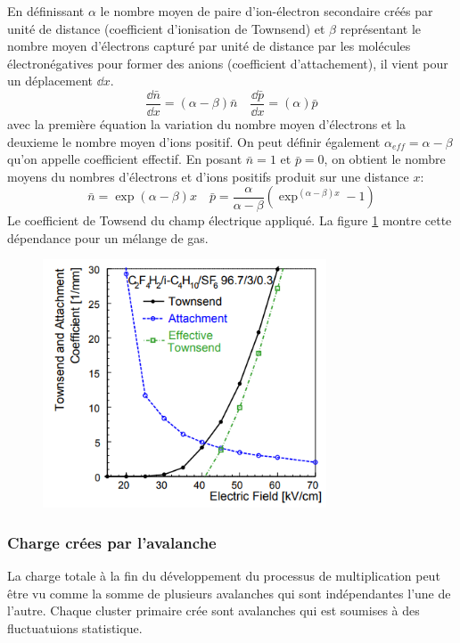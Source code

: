En définissant $\alpha$ le nombre moyen de paire d'ion-électron secondaire créés par unité de distance (coefficient d'ionisation de Townsend) et  $\beta$ représentant le nombre moyen d'électrons capturé par unité de distance par les molécules électronégatives pour former des anions (coefficient d'attachement), il vient pour un déplacement  $\dd x$.
\begin{equation}
	\frac{\dd \bar{n}}{\dd x}=(\alpha-\beta)\bar{n} \quad  \frac{\dd \bar{p}}{\dd x}=(\alpha)\bar{p} 
\end{equation}
avec la première équation la variation du nombre moyen d'électrons et la deuxieme le nombre moyen d'ions positif. On peut définir également $\alpha_{eff}=\alpha-\beta$ qu'on appelle coefficient effectif. En posant $\bar{n}=1$ et $\bar{p}=0$, on obtient le nombre moyens du nombres d'électrons et d'ions positifs produit sur une distance $x$: 
\begin{equation}
\bar{n}=\exp(\alpha-\beta)x \quad \bar{p}=\frac{\alpha}{\alpha-\beta}\left(\exp^{(\alpha-\beta)x}-1\right)
\end{equation}
Le coefficient de Towsend du champ électrique appliqué. La figure \ref{tow} montre cette dépendance pour un mélange de gas.
\begin{figure}[h!]
	\centering
	\includegraphics[width=0.75\textwidth]{RPC/tow.png}
	\label{tow}
\end{figure}


\subsubsection{Charge crées par l'avalanche}
La charge totale à la fin du développement du processus de multiplication peut être vu comme la somme de plusieurs avalanches qui sont indépendantes l'une de l'autre. Chaque cluster primaire crée sont avalanches qui est soumises à des fluctuatuions statistique.

